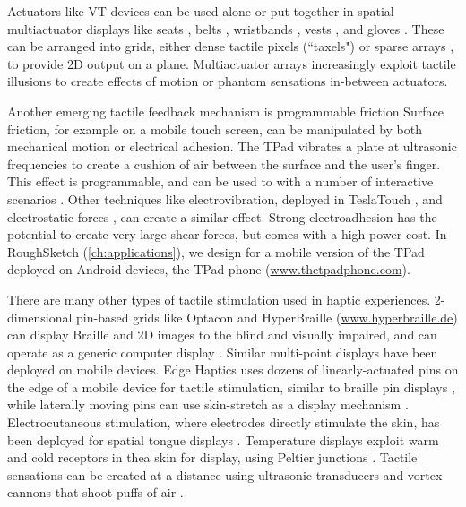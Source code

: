 Actuators like VT devices can be used alone or put together in spatial multiactuator displays like seats \cite{Israr2012,Israr2010}, belts \cite{Pielot2009,Paneels2013}, wristbands \cite{Arab2015,Paneels2013,Gupta2016}, vests \cite{Prasad2014,Jones2004}, and gloves \cite{Park2016,Kim2009}.
These can be arranged into grids, either dense tactile pixels (``taxels") \cite{Kim2009} or sparse arrays \cite{Israr2012,Israr2010}, to provide 2D output on a plane.
Multiactuator arrays increasingly exploit tactile illusions to create effects of motion or phantom sensations in-between actuators.

Another emerging tactile feedback mechanism is programmable friction
Surface friction, for example on a mobile touch screen, can be manipulated by both mechanical motion or electrical adhesion.
The TPad \cite{Winfield2007} vibrates a plate at ultrasonic frequencies to create a cushion of air between the surface and the user's finger.
This effect is programmable, and can be used to with a number of interactive scenarios \cite{Levesque2011}.
Other techniques like electrovibration, deployed in TeslaTouch \cite{Bau2010}, and electrostatic forces \cite{Meyer2013}, can create a similar effect.
Strong electroadhesion \cite{Shultz2015} has the potential to create very large shear forces, but comes with a high power cost.
In RoughSketch (\autoref{ch:applications}), we design for a mobile version of the TPad deployed on Android devices, the TPad phone (\url{www.thetpadphone.com}).

There are many other types of tactile stimulation used in haptic experiences.
2-dimensional pin-based grids like Optacon \cite{Bliss1970} and HyperBraille (\url{www.hyperbraille.de}) can display Braille and 2D images to the blind and visually impaired, and can operate as a generic computer display \cite{Prescher2010}. 
Similar multi-point displays have been deployed on mobile devices.
Edge Haptics uses dozens of linearly-actuated pins on the edge of a mobile device for tactile stimulation, similar to braille pin displays \cite{Jang2016}, while laterally moving pins can use skin-stretch as a display mechanism \cite{Luk2006}.
Electrocutaneous stimulation, where electrodes directly stimulate the skin, has been deployed for spatial tongue displays \cite{Bach-y-Rita1998}.
Temperature displays exploit warm and cold receptors in thea skin for display, using Peltier junctions \cite{Jones2002}.
Tactile sensations can be created at a distance using ultrasonic transducers \cite{Obrist2013,Carter2013} and vortex cannons that shoot puffs of air \cite{Sodhi2013}.



